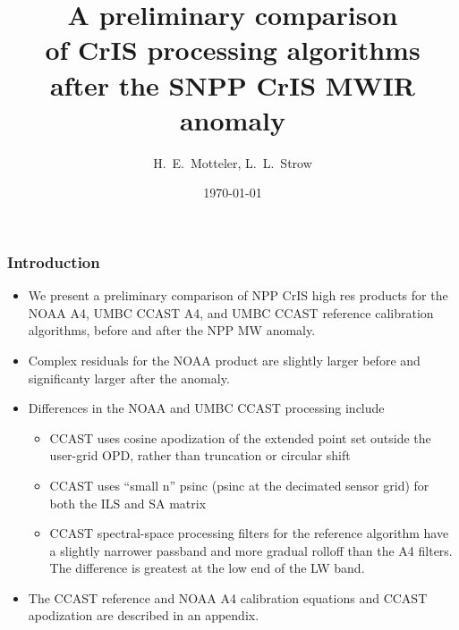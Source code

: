 \documentclass[10pt]{beamer}
\title{A preliminary comparison \\
       of CrIS processing algorithms \\
       after the SNPP CrIS MWIR anomaly \\
}
\author{H.~E.~Motteler, L.~L.~Strow}
\institute{
  UMBC Atmospheric Spectroscopy Lab \\
  Joint Center for Earth Systems Technology \\
}
\date{\today}
\begin{document}
\begin{frame}[plain]
\titlepage
\end{frame}
\begin{frame}
\frametitle{Introduction}
\begin{itemize}

  \item We present a preliminary comparison of NPP CrIS high res
    products for the NOAA A4, UMBC CCAST A4, and UMBC CCAST
    reference calibration algorithms, before and after the NPP MW
    anomaly.

  \item Complex residuals for the NOAA product are slightly larger
    before and significanty larger after the anomaly.

  \item Differences in the NOAA and UMBC CCAST processing include
  \begin{itemize}
    \item CCAST uses cosine apodization of the extended point set
      outside the user-grid OPD, rather than truncation or circular
      shift

    \item CCAST uses ``small n'' psinc (psinc at the decimated
      sensor grid) for both the ILS and SA matrix

    \item CCAST spectral-space processing filters for the reference
      algorithm have a slightly narrower passband and more gradual
      rolloff than the A4 filters.  The difference is greatest at
      the low end of the LW band.

  \end{itemize}

  \item The CCAST reference and NOAA A4 calibration equations and
    CCAST apodization are described in an appendix.

\end{itemize}
\end{frame}
\end{document}
